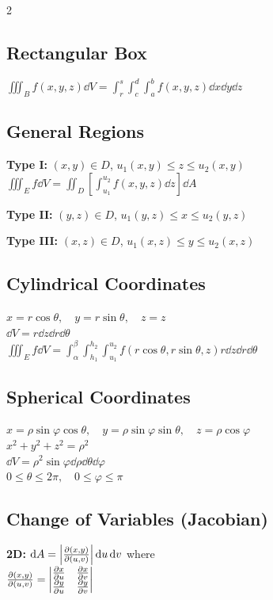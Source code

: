 \documentclass[8pt]{extarticle}
\begin{document}
\begin{multicols}{2}
\subsection*{Rectangular Box}
$\iiint_B f(x,y,z) \dd{V} = \int_r^s \int_c^d \int_a^b f(x,y,z) \dd{x}\dd{y}\dd{z}$

\subsection*{General Regions}
\textbf{Type I:} $(x,y) \in D$, $u_1(x,y) \le z \le u_2(x,y)$ \\
$\iiint_E f \dd{V} = \iint_D \left[\int_{u_1}^{u_2} f(x,y,z) \dd{z}\right] \dd{A}$

\textbf{Type II:} $(y,z) \in D$, $u_1(y,z) \le x \le u_2(y,z)$

\textbf{Type III:} $(x,z) \in D$, $u_1(x,z) \le y \le u_2(x,z)$

\subsection*{Cylindrical Coordinates}
$x = r\cos\theta, \quad y = r\sin\theta, \quad z = z$ \\
$\dd{V} = r\dd{z}\dd{r}\dd{\theta}$ \\
$\iiint_E f \dd{V} = \int_\alpha^\beta \int_{h_1}^{h_2} \int_{u_1}^{u_2} f(r\cos\theta,r\sin\theta,z) r\dd{z}\dd{r}\dd{\theta}$

\subsection*{Spherical Coordinates}
$x = \rho\sin\varphi\cos\theta, \quad y = \rho\sin\varphi\sin\theta, \quad z = \rho\cos\varphi$ \\
$x^2 + y^2 + z^2 = \rho^2$ \\
$\dd{V} = \rho^2\sin\varphi\dd{\rho}\dd{\theta}\dd{\varphi}$ \\
$0 \le \theta \le 2\pi, \quad 0 \le \varphi \le \pi$

\subsection*{Change of Variables (Jacobian)}
\textbf{2D:} $\dd{A} = \left|\pdv{(x,y)}{(u,v)}\right| \dd{u}\dd{v}$ where \\
$\pdv{(x,y)}{(u,v)} = \begin{vmatrix} \pdv{x}{u} & \pdv{x}{v} \\ \pdv{y}{u} & \pdv{y}{v} \end{vmatrix}$


\end{multicols}
\end{document}
